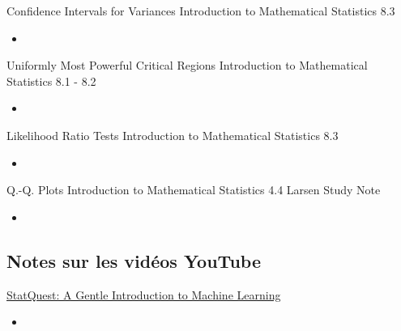 \begin{CHPT_SUMM_AUTO_NUMB}[label = {L.-38}]{Confidence Intervals for Variances}
Introduction to Mathematical Statistics 8.3
	\begin{itemize}
		\item	
	\end{itemize}
\end{CHPT_SUMM_AUTO_NUMB}

\begin{CHPT_SUMM_AUTO_NUMB}[label = {L.-39}]{Uniformly Most Powerful Critical Regions}
Introduction to Mathematical Statistics 8.1 - 8.2
	\begin{itemize}
		\item	
	\end{itemize}
\end{CHPT_SUMM_AUTO_NUMB}

\begin{CHPT_SUMM_AUTO_NUMB}[label = {L.-40}]{Likelihood Ratio Tests}
Introduction to Mathematical Statistics 8.3
	\begin{itemize}
		\item	
	\end{itemize}
\end{CHPT_SUMM_AUTO_NUMB}

\begin{CHPT_SUMM_AUTO_NUMB}[label = {L.-41}]{Q.-Q. Plots}
Introduction to Mathematical Statistics 4.4
Larsen Study Note
	\begin{itemize}
		\item	
	\end{itemize}
\end{CHPT_SUMM_AUTO_NUMB}

\subsection{Notes sur les vidéos YouTube}

\begin{YTB_SUMM}[label = {SQ-BASICS-ML-INTRO}]{\href{https://www.youtube.com/watch?v=Gv9_4yMHFhI&list=PLblh5JKOoLUICTaGLRoHQDuF_7q2GfuJF&index=2&t=0s}{StatQuest: A Gentle Introduction to Machine Learning}}
\begin{itemize}
	\item	
\end{itemize}
\end{YTB_SUMM}